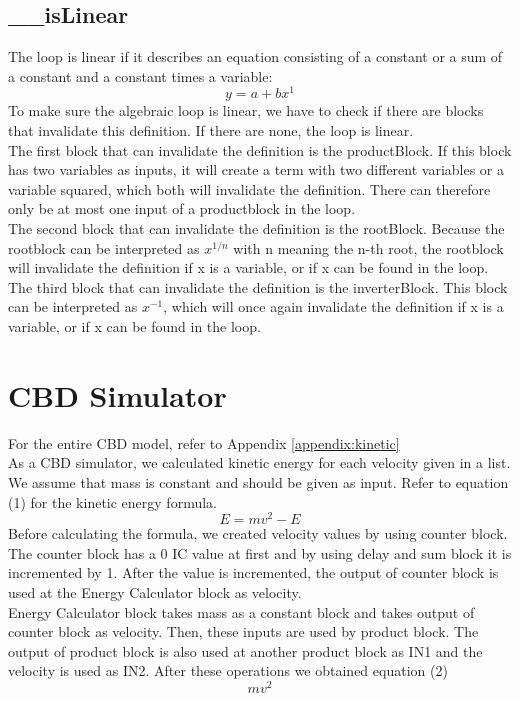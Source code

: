 \documentclass{article}
\begin{document}
\subsection{\_\_isLinear}
The loop is linear if it describes an equation consisting of a constant or a sum of a constant and a constant times a variable:
\[y = a + bx^1\]
To make sure the algebraic loop is linear, we have to check if there are blocks that invalidate this definition. If there are none, the loop is linear.
\\The first block that can invalidate the definition is the productBlock. If this block has two variables as inputs, it will create a term with two different variables or a variable squared, which both will invalidate the definition. There can therefore only be at most one input of a productblock in the loop.
\\The second block that can invalidate the definition is the rootBlock. Because the rootblock can be interpreted as \(x^{1/n}\) with n meaning the n-th root, the rootblock will invalidate the definition if x is a variable, or if x can be found in the loop.
\\The third block that can invalidate the definition is the inverterBlock. This block can be interpreted as \(x^{-1}\), which will once again invalidate the definition if x is a variable, or if x can be found in the loop.

\section{CBD Simulator}
For the entire CBD model, refer to Appendix \ref{appendix:kinetic} \\
As a CBD simulator, we calculated kinetic energy for each velocity given in a list. 
We assume that mass is constant and should be given as input. Refer to equation (1) for the kinetic energy formula.
\begin{equation}
E=mv^2-E
\end{equation}
Before calculating the formula, we created velocity values by using counter block. The counter block has a 0 IC value at first and by using delay and sum block it is incremented by 1. After the value is incremented, the output of counter block is used at the Energy Calculator block as velocity. \\

Energy Calculator block takes mass as a constant block and takes output of counter block as velocity. Then, these inputs are used by product block. The output of product block is also used at another product block as IN1 and the velocity is used as IN2. After these operations we obtained equation (2)\\
\begin{equation}
mv^2
\end{equation}
\end{document}
